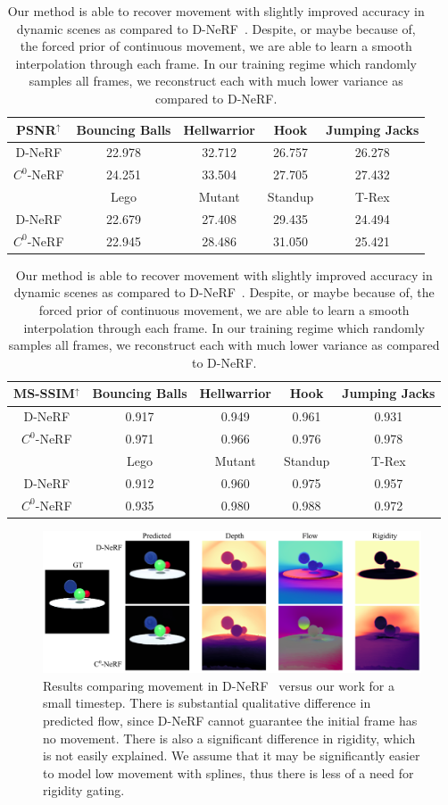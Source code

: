 \begin{table}[t]
    \centering
    \begin{tabular}{|c|c|c|c|c|}
    \hline
    \textbf{PSNR$^\uparrow$} & Bouncing Balls & Hellwarrior & Hook & Jumping Jacks \\
    \hline
    D-NeRF & 22.978 & 32.712 & 26.757 & 26.278 \\
    \hline
    $C^0$-NeRF & 24.251 & 33.504 & 27.705 & 27.432 \\
    \hline
    & Lego & Mutant & Standup & T-Rex \\
    \hline
    D-NeRF & 22.679 & 27.408 & 29.435 & 24.494 \\
    \hline
    $C^0$-NeRF & 22.945 & 28.486 & 31.050 & 25.421 \\
    \hline
    \end{tabular}
    \centering
    \begin{tabular}{|c|c|c|c|c|}
    \hline
    \textbf{MS-SSIM$^\uparrow$} & Bouncing Balls & Hellwarrior & Hook & Jumping Jacks \\
    \hline
    D-NeRF & 0.917 & 0.949 & 0.961 & 0.931 \\
    \hline
    $C^0$-NeRF & 0.971 & 0.966 & 0.976 & 0.978 \\
    \hline
    & Lego & Mutant & Standup & T-Rex \\
    \hline
    D-NeRF & 0.912 & 0.960 & 0.975 & 0.957  \\
    \hline
    $C^0$-NeRF & 0.935 & 0.980 & 0.988 & 0.972 \\
    \hline
    \end{tabular}
    \caption{
        Our method is able to recover movement with slightly improved accuracy in dynamic scenes as compared to D-NeRF~\cite{pumarola2020dnerf}. Despite, or maybe because of, the forced prior of continuous movement, we are able to learn a smooth interpolation through each frame. In our training regime which randomly samples all frames, we reconstruct each with much lower variance as compared to D-NeRF.
    }
\end{table}

\begin{figure}
    \includegraphics[width=\textwidth]{dnerf_compare}
    \caption{
        \label{fig:dnerf_cmp}
        Results comparing movement in D-NeRF~\cite{pumarola2020dnerf} versus our work for a small timestep. There is substantial qualitative difference in predicted flow, since D-NeRF cannot guarantee the initial frame has no movement. There is also a significant difference in rigidity, which is not easily explained. We assume that it may be significantly easier to model low movement with splines, thus there is less of a need for rigidity gating.
    }
\end{figure}
